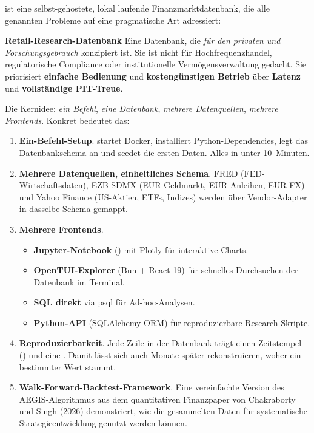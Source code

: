  ist eine selbst-gehostete, lokal laufende
Finanzmarktdatenbank, die alle genannten Probleme auf eine pragmatische
Art adressiert:

\begin{definition}
\textbf{Retail-Research-Datenbank}
Eine Datenbank, die \emph{für den privaten und Forschungsgebrauch}
konzipiert ist. Sie ist nicht für Hochfrequenzhandel, regulatorische
Compliance oder institutionelle Vermögensverwaltung gedacht. Sie
priorisiert \textbf{einfache Bedienung} und \textbf{kostengünstigen
Betrieb} über \textbf{Latenz} und \textbf{vollständige PIT-Treue}.
\end{definition}

Die Kernidee: \emph{ein Befehl}, \emph{eine Datenbank}, \emph{mehrere
Datenquellen}, \emph{mehrere Frontends}. Konkret bedeutet das:

\begin{enumerate}
  \item \textbf{Ein-Befehl-Setup}.  startet Docker,
        installiert Python-Dependencies, legt das Datenbankschema an
        und seedet die ersten Daten. Alles in unter 10~Minuten.
  \item \textbf{Mehrere Datenquellen, einheitliches Schema}. FRED
        (FED-Wirtschaftsdaten), EZB SDMX (EUR-Geldmarkt, EUR-Anleihen,
        EUR-FX) und Yahoo Finance (US-Aktien, ETFs, Indizes) werden über
        Vendor-Adapter in dasselbe Schema gemappt.
  \item \textbf{Mehrere Frontends}.
        \begin{itemize}
          \item \textbf{Jupyter-Notebook} ()
                mit Plotly für interaktive Charts.
          \item \textbf{OpenTUI-Explorer} (Bun + React 19) für
                schnelles Durchsuchen der Datenbank im Terminal.
          \item \textbf{SQL direkt} via psql für Ad-hoc-Analysen.
          \item \textbf{Python-API} (SQLAlchemy ORM) für reproduzierbare
                Research-Skripte.
        \end{itemize}
  \item \textbf{Reproduzierbarkeit}. Jede Zeile in der Datenbank trägt
        einen Zeitstempel () und eine
        . Damit lässt sich auch Monate später
        rekonstruieren, woher ein bestimmter Wert stammt.
  \item \textbf{Walk-Forward-Backtest-Framework}. Eine
        vereinfachte Version des AEGIS-Algorithmus aus dem
        quantitativen Finanzpaper von Chakraborty und Singh
        (2026) demonstriert, wie die gesammelten Daten für
        systematische Strategieentwicklung genutzt werden können.
\end{enumerate}

